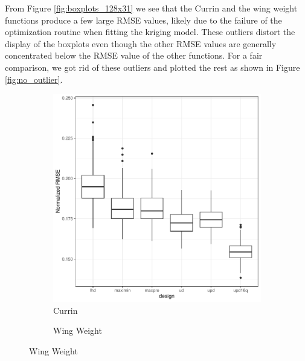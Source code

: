 \documentclass [PhD] {package/uclathes}
\begin{document}
From Figure \ref{fig:boxplots_128x31} we see that the Currin and the wing weight functions  produce a few large RMSE values, likely due to the failure of the optimization routine when fitting the kriging model. These outliers distort the display of the boxplots even though the other RMSE values are generally concentrated below the RMSE value of the other functions. For a fair comparison, we got rid of these outliers and plotted the rest as shown in Figure \ref{fig:no_outlier}.

\begin{figure}%
\captionsetup[subfigure]{labelformat=empty}
\centering
\begin{subfigure}[b]{0.45\textwidth}
\centering
\caption{Currin}
\includegraphics[width=\textwidth]{chapters/EGO/pdfs/Currin_128x31_no_outlier}
\end{subfigure}
\begin{subfigure}[b]{0.45\textwidth}
\centering
\caption{Wing Weight}

\end{subfigure}
\end{figure}
\end{document}

